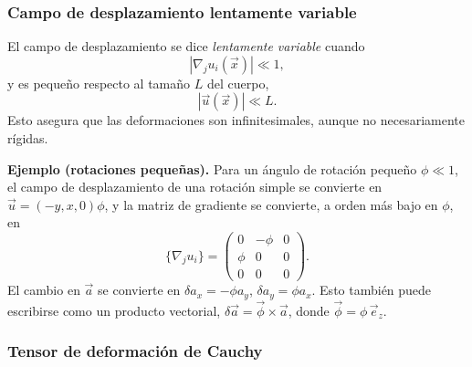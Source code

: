 \subsubsection{Campo de desplazamiento lentamente variable}

El campo de desplazamiento se dice \emph{lentamente variable} cuando
\[ |\nabla_j u_i(\vec{x})| \ll 1, \tag{91} \]
y es pequeño respecto al tamaño $L$ del cuerpo,
\[ |\vec{u}(\vec{x})| \ll L. \tag{92} \]
Esto asegura que las deformaciones son infinitesimales, aunque no necesariamente rígidas.

\textbf{Ejemplo (rotaciones pequeñas).} Para un ángulo de rotación pequeño $\phi \ll 1$, el campo de desplazamiento de una rotación simple se convierte en $\vec{u} = (-y, x, 0)\phi$, y la matriz de gradiente se convierte, a orden más bajo en $\phi$, en
\[ \{\nabla_j u_i\} = \begin{pmatrix} 0 & -\phi & 0 \\ \phi & 0 & 0 \\ 0 & 0 & 0 \end{pmatrix}. \]
El cambio en $\vec{a}$ se convierte en $\delta a_x = -\phi a_y$, $\delta a_y = \phi a_x$. Esto también puede escribirse como un producto vectorial, $\delta\vec{a} = \vec{\phi}\times\vec{a}$, donde $\vec{\phi} = \phi\,\vec{e}_z$.

\subsubsection{Tensor de deformación de Cauchy}

